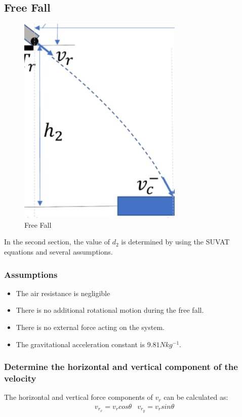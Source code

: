 \documentclass{article}
\begin{document}
    \subsection{Free Fall}
    \begin{figure}[H]
        \centering
        \includegraphics[width=0.25\linewidth]{free_fall.png}
        \caption{Free Fall}
        \label{fig:free_fall}
    \end{figure}
    In the second section, the value of $d_2$ is determined by using the SUVAT equations and several assumptions.
        \subsubsection{Assumptions}
            \begin{itemize}
                \item The air resistance is negligible
                \item There is no additional rotational motion during the free fall.
                \item There is no external force acting on the system.
                \item The gravitational acceleration constant is $9.81 Nkg^{-1}$.
            \end{itemize}
        \subsubsection{Determine the horizontal and vertical component of the velocity}
            The horizontal and vertical force components of $v_r$ can be calculated as:
            \begin{equation}
                \begin{aligned}
                &v_{r_x} = v_rcos\theta  &v_{r_y} = v_rsin\theta
                \end{aligned}
            \end{equation}
\end{document}

